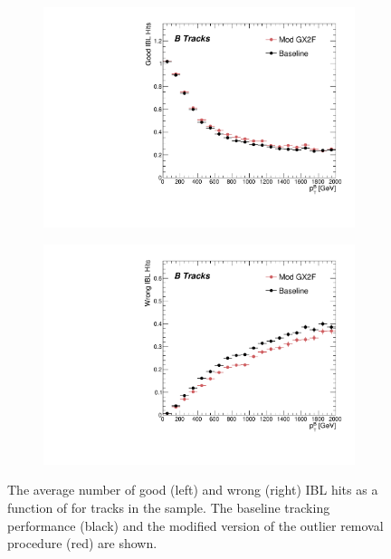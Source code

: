 \begin{figure}[!htbp]
    \centering
    \begin{subfigure}{.48\textwidth}
      \centering
      \includegraphics[width=\textwidth]{chapters/3.tracking/figs/p_nGoodHitsIBL_pTB_From_B.pdf}
    \end{subfigure}%
    \begin{subfigure}{.48\textwidth}
      \centering
      \includegraphics[width=\textwidth]{chapters/3.tracking/figs/p_nWrongHitsIBL_pTB_From_B.pdf}
    \end{subfigure}
    \caption{
      The average number of good (left) and wrong (right) IBL hits as a function of \bhadron \pt for tracks in the \Zprime sample.
      The baseline tracking performance (black) and the modified version of the outlier removal procedure (red) are shown.
    }
    \label{fig:gx2f_opt_hits}
\end{figure}

